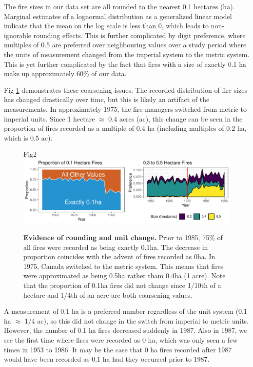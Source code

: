 \documentclass[10pt,letterpaper]{article}
\begin{document}
The fire sizes in our data set are all rounded to the nearest 0.1
hectares (ha). Marginal estimates of a lognormal distribution as a
generalized linear model indicate that the mean on the log scale is less
than 0, which leads to non-ignorable rounding effects. This is further
complicated by digit preference, where multiples of 0.5 are preferred
over neighbouring values over a study period where the units of measurement changed from the imperial system to the metric system. This is yet further complicated by the fact
that fires with a size of exactly 0.1 ha make up approximately 60\% of
our data.

Fig \ref{rounding} demonstrates these coarsening issues. The recorded
distribution of fire sizes has changed drastically over time, but this
is likely an artifact of the measurements. In approximately 1975, the
fire managers switched from metric to imperial units. Since 1 hectare
\(\approx\) 0.4 acres (ac), this change can be seen in the proportion of
fires recorded as a multiple of 0.4 ha (including multiples of 0.2 ha,
which is 0.5 ac).

\begin{figure}[h!]
\centering
Fig2
\includegraphics[width=\textwidth]{Joint_Count_Files/rounding-1.pdf}
\caption{\label{rounding}\textbf{Evidence of rounding and unit change.} Prior to
1985, 75\% of all fires were recorded as being exactly 0.1ha. The
decrease in proportion coincides with the advent of fires recorded as
0ha. In 1975, Canada switched to the metric system. This means that
fires were approximated as being 0.5ha rather tham 0.4ha (1 acre). Note
that the proportion of 0.1ha fires did not change since 1/10th of a
hectare and 1/4th of an acre are both coarsening values.}
\end{figure}

A measurement of 0.1 ha is a preferred number regardless of the unit
system (0.1 ha \(\approx\) 1/4 ac), so this did not change in the switch
from imperial to metric units. However, the number of 0.1 ha fires
decreased suddenly in 1987. Also in 1987, we see the first time where
fires were recorded as 0 ha, which was only seen a few times in 1953 to
1986. It may be the case that 0 ha fires recorded after 1987 would have
been recorded as 0.1 ha had they occurred prior to 1987.
\end{document}
